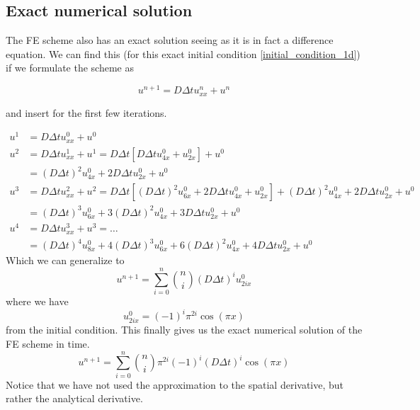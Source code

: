 \subsection{Exact numerical solution}

The FE scheme also has an exact solution seeing as it is in fact a difference equation. 
We can find this (for this exact initial condition \ref{initial_condition_1d}) if we formulate the scheme as 

\begin{equation}
 u^{n+1} = D\Delta t u_{xx}^n + u^n
\end{equation}

and insert for the first few iterations. 

\begin{align*}
 u^1 &= D\Delta t u_{xx}^0 + u^0 \\
 u^2 &= D\Delta t u_{xx}^1 + u^1 = D\Delta t\left[D\Delta t u_{4x}^0 + u_{2x}^0\right] + u^0\\
 &= \left(D\Delta t\right)^2 u_{4x}^0 + 2D\Delta t u_{2x}^0+ u^0 \\
 u^3 &= D\Delta t u_{xx}^2 + u^2 = D\Delta t\left[\left(D\Delta t\right)^2 u_{6x}^0 + 2D\Delta t u_{4x}^0+ u_{2x}^0\right] + \left(D\Delta t\right)^2 u_{4x}^0 + 2D\Delta t u_{2x}^0+ u^0\\
 &= \left(D\Delta t\right)^3 u_{6x}^0 + 3\left(D\Delta t\right)^2 u_{4x}^0+ 3D\Delta tu_{2x}^0 + u^0 \\
 u^4 &= D\Delta t u_{xx}^3 + u^3 = \dots \\
 &= \left(D\Delta t\right)^4 u_{8x}^0 + 4\left(D\Delta t\right)^3 u_{6x}^0+ 6\left(D\Delta t\right)^2 u_{4x}^0 + 4D\Delta t u_{2x}^0 + u^0 
\end{align*}
Which we can generalize to 
\begin{equation}
 u^{n+1} = \sum\limits_{i=0}^n {n\choose i}\left(D\Delta t\right)^iu^0_{2ix}
\end{equation}
where we have
\begin{equation*}
 u^0_{2ix} = \left(-1\right)^i\pi^{2i}\cos(\pi x)
\end{equation*}
from the initial condition. This finally gives us the exact numerical solution of the FE scheme in time. 
\begin{equation}
 u^{n+1} = \sum\limits_{i=0}^n {n\choose i}\pi^{2i}\left(-1\right)^i\left(D\Delta t\right)^i\cos(\pi x)
\end{equation}
Notice that we have not used the approximation to the spatial derivative, but rather the analytical derivative. 
